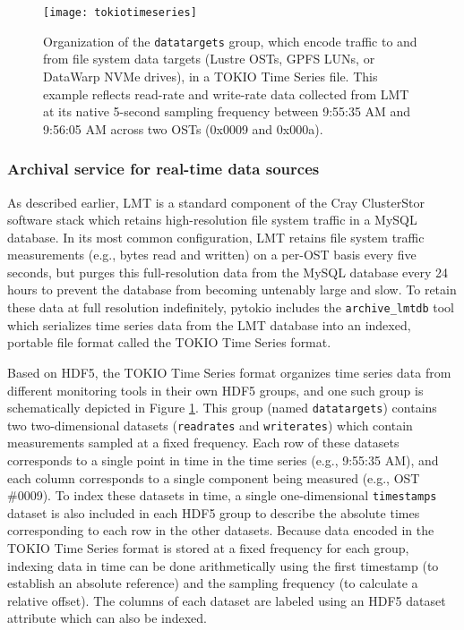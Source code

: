 \begin{figure}
    \centering
    \texttt{[image: tokiotimeseries]}
    \caption{Organization of the \texttt{datatargets} group, which encode traffic to and from file system data targets (Lustre OSTs, GPFS LUNs, or DataWarp NVMe drives), in a TOKIO Time Series file.
    This example reflects read-rate and write-rate data collected from LMT at its native 5-second sampling frequency between 9:55:35 AM and 9:56:05 AM across two OSTs (0x0009 and 0x000a).
    }
    \label{fig:tokiotimeseries}
    \vspace{-.2in}
\end{figure}

\subsubsection{Archival service for real-time data sources}

As described earlier, LMT is a standard component of the Cray ClusterStor software stack which retains high-resolution file system traffic in a MySQL database.
In its most common configuration, LMT retains file system traffic measurements (e.g., bytes read and written) on a per-OST basis every five seconds, but purges this full-resolution data from the MySQL database every 24 hours to prevent the database from becoming untenably large and slow.
To retain these data at full resolution indefinitely, pytokio includes the \texttt{archive\_lmtdb} tool which serializes time series data from the LMT database into an indexed, portable file format called the TOKIO Time Series format.

Based on HDF5, the TOKIO Time Series format organizes time series data from different monitoring tools in their own HDF5 groups, and one such group is schematically depicted in Figure \ref{fig:tokiotimeseries}.
This group (named \texttt{datatargets}) contains two two-dimensional datasets (\texttt{readrates} and \texttt{writerates}) which contain measurements sampled at a fixed frequency.
Each row of these datasets corresponds to a single point in time in the time series (e.g., 9:55:35 AM), and each column corresponds to a single component being measured (e.g., OST \#0009).
To index these datasets in time, a single one-dimensional \texttt{timestamps} dataset is also included in each HDF5 group to describe the absolute times corresponding to each row in the other datasets.
Because data encoded in the TOKIO Time Series format is stored at a fixed frequency for each group, indexing data in time can be done arithmetically using the first timestamp (to establish an absolute reference) and the sampling frequency (to calculate a relative offset).
The columns of each dataset are labeled using an HDF5 dataset attribute which can also be indexed.

